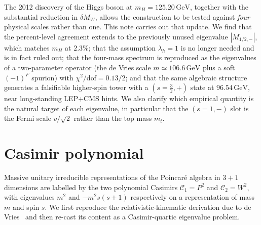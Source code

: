 \documentclass[twocolumn,aps,prd,floatfix,nofootinbib,superscriptaddress,10pt]{article}
\newcommand{\MW}{M_W}
\newcommand{\C}{\mathcal{C}}
\newcommand{\GeV}{\,\mathrm{GeV}}
\begin{document}
The 2012 discovery of the Higgs boson at $m_H=125.20\GeV$, together with the substantial reduction in $\delta\MW$, allows the construction to be tested against {\em four} physical scales rather than one. This note carries out that update. We find that the percent-level agreement extends to the previously unused eigenvalue $|M_{1/2,-}|$, which matches $m_H$ at $2.3\%$; that the assumption $\lambda_h=1$ is no longer needed and is in fact ruled out; that the four-mass spectrum is reproduced as the eigenvalues of a two-parameter operator (the de Vries scale $m\simeq 106.6\GeV$ plus a soft $(-1)^F$ spurion) with $\chi^2/\mathrm{dof}=0.13/2$; and that the same algebraic structure generates a falsifiable higher-spin tower with a $(s=\tfrac32,+)$ state at $96.54\GeV$, near long-standing LEP+CMS hints. We also clarify which empirical quantity is the natural target of each eigenvalue, in particular that the $(s=1,-)$ slot is the Fermi scale $v/\sqrt{2}$ rather than the top mass $m_t$.

\section{Casimir polynomial}
\label{sec:casimir}

Massive unitary irreducible representations of the Poincar\'e algebra in $3{+}1$ dimensions are labelled by the two polynomial Casimirs $\C_1=P^2$ and $\C_2=W^2$, with eigenvalues $m^2$ and $-m^2 s(s+1)$ respectively on a representation of mass $m$ and spin $s$. We first reproduce the relativistic-kinematic derivation due to de Vries~\cite{deVries2004} and then re-cast its content as a Casimir-quartic eigenvalue problem.
\end{document}
